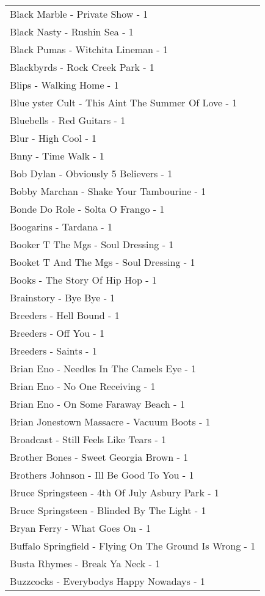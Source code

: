 \documentclass[
]{article}
\begin{document}
\begin{longtable}{l}
Black Marble - Private Show - 1 \\ 
Black Nasty - Rushin Sea - 1 \\ 
Black Pumas - Witchita Lineman - 1 \\ 
Blackbyrds - Rock Creek Park - 1 \\ 
Blips - Walking Home - 1 \\ 
Blue yster Cult - This Aint The Summer Of Love - 1 \\ 
Bluebells - Red Guitars - 1 \\ 
Blur - High Cool - 1 \\ 
Bnny - Time Walk - 1 \\ 
Bob Dylan - Obviously 5 Believers - 1 \\ 
Bobby Marchan - Shake Your Tambourine - 1 \\ 
Bonde Do Role - Solta O Frango - 1 \\ 
Boogarins - Tardana - 1 \\ 
Booker T The Mgs - Soul Dressing - 1 \\ 
Booket T And The Mgs - Soul Dressing - 1 \\ 
Books - The Story Of Hip Hop - 1 \\ 
Brainstory - Bye Bye - 1 \\ 
Breeders - Hell Bound - 1 \\ 
Breeders - Off You - 1 \\ 
Breeders - Saints - 1 \\ 
Brian Eno - Needles In The Camels Eye - 1 \\ 
Brian Eno - No One Receiving - 1 \\ 
Brian Eno - On Some Faraway Beach - 1 \\ 
Brian Jonestown Massacre - Vacuum Boots - 1 \\ 
Broadcast - Still Feels Like Tears - 1 \\ 
Brother Bones - Sweet Georgia Brown - 1 \\ 
Brothers Johnson - Ill Be Good To You - 1 \\ 
Bruce Springsteen - 4th Of July Asbury Park - 1 \\ 
Bruce Springsteen - Blinded By The Light - 1 \\ 
Bryan Ferry - What Goes On - 1 \\ 
Buffalo Springfield - Flying On The Ground Is Wrong - 1 \\ 
Busta Rhymes - Break Ya Neck - 1 \\ 
Buzzcocks - Everybodys Happy Nowadays - 1 \\ 

\end{longtable}
\end{document}
